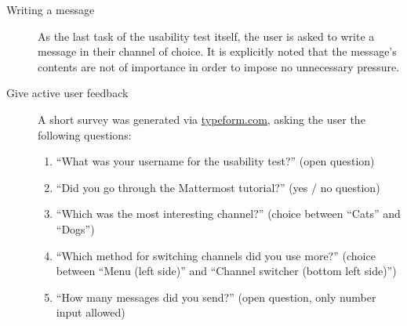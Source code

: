\begin{description}
\item [Writing a message] As the last task of the usability test itself, the user is asked to write a message in their channel of choice.
It is explicitly noted that the message's contents are not of importance in order to impose no unnecessary pressure.

\item [Give active user feedback] A short survey was generated via \url{typeform.com}, asking the user the following questions:

\begin{enumerate}
\item ``What was your username for the usability test?'' (open question)
\item ``Did you go through the Mattermost tutorial?'' (yes / no question)
\item ``Which was the most interesting channel?'' (choice between ``Cats'' and ``Dogs'')
\item ``Which method for switching channels did you use more?'' (choice between ``Menu (left side)'' and ``Channel switcher (bottom left side)'')
\item ``How many messages did you send?'' (open question, only number input allowed)
\end{enumerate}

\end{description}


%
%
%
%
%
%


